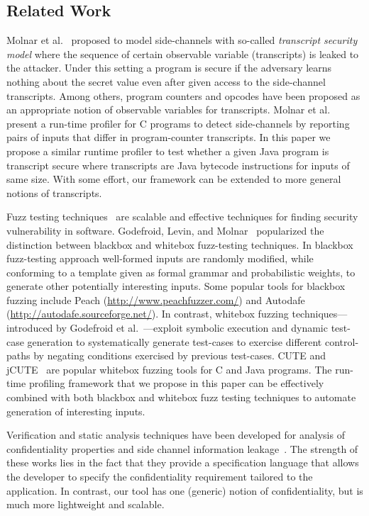 \subsection{Related Work} 

Molnar et al.~\cite{Molnar05} proposed to model side-channels with
so-called \emph{transcript security model} where the sequence of certain
observable variable (transcripts) is leaked to the attacker.
Under this setting a program is secure if the adversary learns nothing about the
secret value even after given access to the side-channel transcripts.
Among others, program counters and opcodes have been proposed as an appropriate
notion of observable variables for transcripts.
Molnar et al.~\cite{Molnar05} present a run-time profiler for C programs to
detect side-channels by reporting pairs of inputs that differ in program-counter
transcripts.
In this paper we propose a similar runtime profiler to test whether a given
Java program is transcript secure where transcripts are Java bytecode
instructions for inputs of same size.
With some effort, our framework can be extended to more general notions of
transcripts.

Fuzz testing techniques~\cite{God12} are scalable and effective techniques for finding security
vulnerability in software.
Godefroid, Levin, and Molnar~\cite{God12} popularized the distinction between
blackbox and whitebox fuzz-testing techniques.
In blackbox fuzz-testing approach well-formed inputs are randomly modified,
while conforming to a template given as formal grammar and probabilistic
weights, to generate other potentially interesting inputs.  
Some popular tools for blackbox fuzzing include Peach 
(\url{http://www.peachfuzzer.com/}) and Autodafe
(\url{http://autodafe.sourceforge.net/}).
In contrast, whitebox fuzzing techniques---introduced by Godefroid et
al.~\cite{God12,GKS05}---exploit symbolic execution and dynamic test-case generation
to systematically generate test-cases to exercise different control-paths by
negating conditions exercised by previous test-cases.
CUTE and jCUTE~\cite{Sen2006} are popular whitebox fuzzing tools for C and Java
programs. 
The run-time profiling framework that we propose in this paper can be
effectively combined with both blackbox and whitebox fuzz testing techniques to
automate generation of interesting inputs.

Verification and static analysis techniques have been developed for
analysis of confidentiality properties and side channel information
leakage~\cite{EWS14,KMO12,BSB07,BDG12,CA09}. The strength of these
works lies in the fact that they provide a specification language that
allows the developer to specify the confidentiality requirement
tailored to the application. In contrast, our tool has one
(generic) notion of confidentiality, but is much more lightweight and
scalable. 

